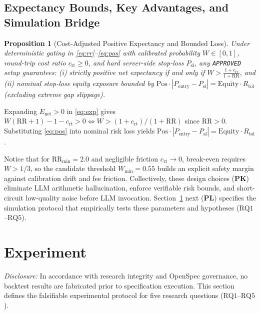 \documentclass[conference]{IEEEtran}
\newtheorem{proposition}{Proposition}
\begin{document}
\subsection{Expectancy Bounds, Key Advantages, and Simulation Bridge}
\begin{proposition}[Cost-Adjusted Positive Expectancy and Bounded Loss]
\label{prop:expectancy}
Under deterministic gating in \eqref{eq:rr}--\eqref{eq:pos} with calibrated probability $W \in [0,1]$, round-trip cost ratio $c_{\mathrm{rt}} \ge 0$, and hard server-side stop-loss $P_{\text{sl}}$, any \texttt{APPROVED} setup guarantees: (i) strictly positive net expectancy if and only if $W > \frac{1 + c_{\mathrm{rt}}}{1 + \mathrm{RR}}$, and (ii) nominal stop-loss equity exposure bounded by $\mathrm{Pos} \cdot |P_{\text{entry}} - P_{\text{sl}}| = \mathrm{Equity} \cdot R_{\text{tol}}$ (excluding extreme gap slippage).
\end{proposition}
\begin{IEEEproof}
Expanding $E_{\text{net}} > 0$ in \eqref{eq:exp} gives $W(\mathrm{RR} + 1) - 1 - c_{\mathrm{rt}} > 0 \iff W > (1 + c_{\mathrm{rt}})/(1 + \mathrm{RR})$ since $\mathrm{RR} > 0$. Substituting \eqref{eq:pos} into nominal risk loss yields $\mathrm{Pos} \cdot |P_{\text{entry}} - P_{\text{sl}}| = \mathrm{Equity} \cdot R_{\text{tol}}$.
\end{IEEEproof}
Notice that for $\mathrm{RR}_{\min} = 2.0$ and negligible friction $c_{\mathrm{rt}} \to 0$, break-even requires $W > 1/3$, so the candidate threshold $W_{\min} = 0.55$ builds an explicit safety margin against calibration drift and fee friction. Collectively, these design choices (\textbf{PK}) eliminate LLM arithmetic hallucination, enforce verifiable risk bounds, and short-circuit low-quality noise before LLM invocation. Section~\ref{sec:experiment} next (\textbf{PL}) specifies the simulation protocol that empirically tests these parameters and hypotheses ($\mathrm{RQ1}$--$\mathrm{RQ5}$).

\section{Experiment}
\label{sec:experiment}

\textit{Disclosure:} In accordance with research integrity and OpenSpec governance, no backtest results are fabricated prior to specification execution. This section defines the falsifiable experimental protocol for five research questions ($\mathrm{RQ1}$--$\mathrm{RQ5}$).
\end{document}
